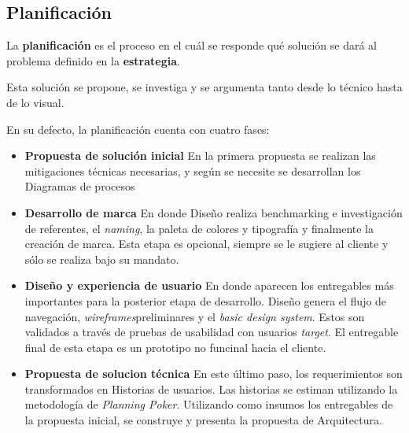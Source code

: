 \subsection{Planificación}

La \textbf{planificación} es el proceso en el cuál se responde qué solución se dará al problema definido en la \textbf{estrategia}.

Esta solución se propone, se investiga y se argumenta tanto desde lo técnico hasta de lo visual.

En su defecto, la planificación cuenta con cuatro fases:
\begin{itemize}
    \item \textbf{Propuesta de solución inicial}
    En la primera propuesta se realizan las mitigaciones técnicas necesarias, y según se necesite se 
    desarrollan los Diagramas de procesos
    \item \textbf{Desarrollo de marca} En donde Diseño realiza benchmarking e investigación
    de referentes, el \textit{naming}, la paleta de colores y tipografía y
    finalmente la creación de marca. Esta etapa es opcional, siempre se le sugiere al cliente y
    sólo se realiza bajo su mandato.
    \item \textbf{Diseño y experiencia de usuario}
    En donde aparecen los entregables más importantes para la posterior etapa de desarrollo. 
    Diseño genera el flujo de navegación, \textit{wireframes}\footnotemark[8] preliminares y el \textit{basic design system}\footnotemark[9].
    Estos son validados a través de pruebas de usabilidad con usuarios \textit{target}.
    El entregable final de esta etapa es un prototipo no funcinal hacia el cliente.
    \item \textbf{Propuesta de solucion técnica}
    En este último paso, los requerimientos son transformados en Historias de usuarios. Las historias se estiman utilizando la metodología de \textit{Planning Poker}\footnotemark[10].
    Utilizando como insumos los entregables de la propuesta inicial, se construye y presenta la propuesta de Arquitectura.
\end{itemize}


